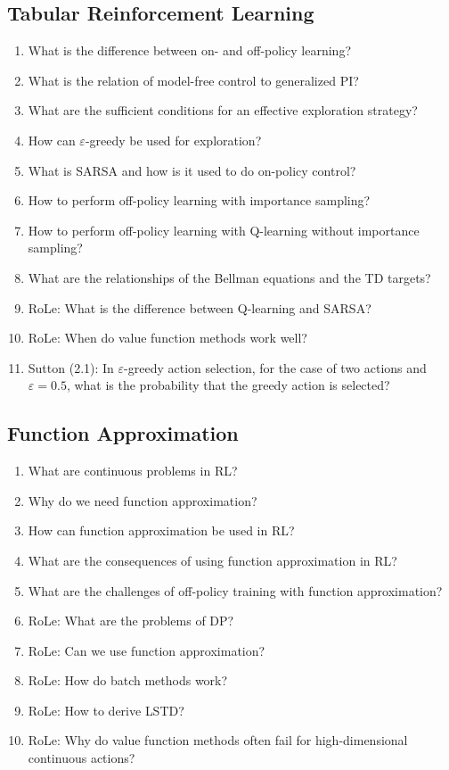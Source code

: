 		\subsection{Tabular Reinforcement Learning}
			\begin{enumerate}
				\item What is the difference between on- and off-policy learning?
				\item What is the relation of model-free control to generalized \ac{PI}?
				\item What are the sufficient conditions for an effective exploration strategy?
				\item How can \(\varepsilon\)-greedy be used for exploration?
				\item What is \ac{SARSA} and how is it used to do on-policy control?
				\item How to perform off-policy learning with importance sampling?
				\item How to perform off-policy learning with Q-learning without importance sampling?
				\item What are the relationships of the Bellman equations and the \ac{TD} targets?
				\item RoLe: What is the difference between Q-learning and \ac{SARSA}?
				\item RoLe: When do value function methods work well?
				\item Sutton (2.1): In \(\varepsilon\)-greedy action selection, for the case of two actions and \(\varepsilon = 0.5\), what is the probability that the greedy action is selected?
			\end{enumerate}

		\subsection{Function Approximation}
			\begin{enumerate}
				\item What are continuous problems in \ac{RL}?
				\item Why do we need function approximation?
				\item How can function approximation be used in \ac{RL}?
				\item What are the consequences of using function approximation in \ac{RL}?
				\item What are the challenges of off-policy training with function approximation?
				\item RoLe: What are the problems of \ac{DP}?
				\item RoLe: Can we use function approximation?
				\item RoLe: How do batch methods work?
				\item RoLe: How to derive \ac{LSTD}?
				\item RoLe: Why do value function methods often fail for high-dimensional continuous actions?
			\end{enumerate}

